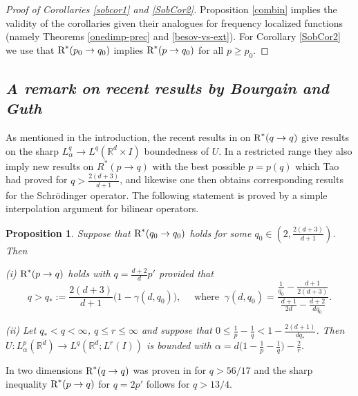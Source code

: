 \documentclass[11pt]{amsart}
\newtheorem{proposition}[theorem]{Proposition}
\theoremstyle{definition}
\numberwithin{theorem}{section}
\numberwithin{definition}{section}
\numberwithin{equation}{section}
\renewcommand{\le}{\leqslant}
\renewcommand{\ge}{\geqslant}
\def\bbR{{\mathbb {R}}}
\renewcommand{\le}{\leqslant}
\renewcommand{\ge}{\geqslant}
\begin{document}
\begin{proof}[Proof of Corollaries
\ref{sobcor1} and \ref{SobCor2}]
Proposition \ref{combin} implies  the validity of  the corollaries
given their analogues for
frequency localized functions (namely Theorems \ref{onedimp-prec} and
\ref{besov-vs-ext}).  For Corollary \ref{SobCor2} we use that $\text{\rm R}^*(p_0\to q_0)$ implies $\text{\rm R}^*(p\to q_0)$ for all $p\ge p_0$.
\end{proof}






\subsection{\it A remark on recent results by
Bourgain and Guth}\label{bgpq}
As mentioned in the introduction, the recent results in  \cite{bogu} on
$\text{\rm R}^*(q\to q)$
give  results  on the sharp $L^q_\alpha\to L^q(\bbR^d\times I)$
boundedness of $U$. In a restricted range they also imply new results
on $R^*(p\to q)$ with the best possible $p=p(q)$ which Tao \cite{ta} had proved
for $q>\frac{2(d+3)}{d+1}$, and likewise one then obtains corresponding results for the Schr\"odinger operator.
The following statement  is proved by
a simple interpolation argument for bilinear operators.


\begin{proposition}\label{bg}
Suppose that  $\text{\rm R}^*(q_0\to q_0)$
 holds for some
$q_0\in (2,\frac{2(d+3)}{d+1})$.  Then

\noindent (i) $\text{\rm R}^*(p\to q)$ holds with
$q=\frac{d+2}{d} p'$
provided that
\begin{equation*}
q>q_*:=\frac{2(d+3)}{d+1}\Big(1-\gamma(d,q_0)\Big),\quad
\text{ where }\ \gamma(d,q_0)=
\frac{\frac{1}{q_0}-\frac{d+1}{2(d+3)}}
{\frac{d+1}{2d}-\frac{d+2}{dq_0}}.
\end{equation*}

\noindent (ii) Let $q_*<q<\infty$, $q\le r\le \infty$
and suppose that $0\le \frac{1}{p}-\frac{1}{q}<
1-\frac{2(d+1)}{dq_*}$.
 Then $U:
L^p_{\alpha}(\bbR^d)\to L^q(\bbR^{d};L^r(I))$ is bounded with
$\alpha= d\big(1-\frac 1p-\frac 1q\big)-\frac 2r$.
\end{proposition}
In two dimensions $\text{\rm R}^*(q\to q)$
was proven in \cite{bogu} for $q>56/17$ and the sharp
inequality
$\text{\rm R}^*(p\to q)$  for $q=2p'$ follows for $q>13/4$.
\end{document}
